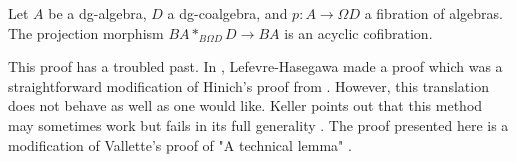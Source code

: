 \documentclass[../thesis.tex]{subfiles}
\begin{document}

            \begin{lemma}\label{lem: tech-fac}
                Let $A$ be a dg-algebra, $D$ a dg-coalgebra, and $p: A \rightarrow \Omega D$ a fibration of algebras. The projection morphism $BA\ast_{B\Omega D}D \rightarrow BA$ is an acyclic cofibration.
                \begin{center}
                \end{center}
            \end{lemma}

            This proof has a troubled past. In \cite{LefevreHasegawa03}, Lefevre-Hasegawa made a proof which was a straightforward modification of Hinich's proof from \cite{Hinich01}. However, this translation does not behave as well as one would like. Keller points out that this method may sometimes work but fails in its full generality \cite{Keller06}. The proof presented here is a modification of Vallette's proof of "A technical lemma" \cite[Appendix B]{Vallette20}.
\end{document}
